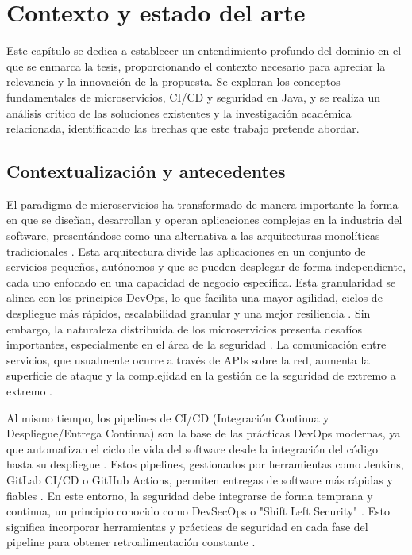\chapter{Contexto y estado del arte}\label{chap:contexto_estado_arte} %
Este capítulo se dedica a establecer un entendimiento profundo del dominio en el que se enmarca la tesis, proporcionando el contexto necesario para apreciar la relevancia y la innovación de la propuesta. Se exploran los conceptos fundamentales de microservicios, CI/CD y seguridad en Java, y se realiza un análisis crítico de las soluciones existentes y la investigación académica relacionada, identificando las brechas que este trabajo pretende abordar.

\section{Contextualización y antecedentes}\label{sec:contextyantec}
El paradigma de microservicios ha transformado de manera importante la forma en que se diseñan, desarrollan y operan aplicaciones complejas en la industria del software, presentándose como una alternativa a las arquitecturas monolíticas tradicionales \cite{Zafeiropoulos2023SecurityGaps}. Esta arquitectura divide las aplicaciones en un conjunto de servicios pequeños, autónomos y que se pueden desplegar de forma independiente, cada uno enfocado en una capacidad de negocio específica. Esta granularidad se alinea con los principios DevOps, lo que facilita una mayor agilidad, ciclos de despliegue más rápidos, escalabilidad granular y una mejor resiliencia \cite{Scheerer2020ValueMicroservices}. Sin embargo, la naturaleza distribuida de los microservicios presenta desafíos importantes, especialmente en el área de la seguridad \cite{Zafeiropoulos2023SecurityGaps, AlDhuraibi2022SecurityIssues}. La comunicación entre servicios, que usualmente ocurre a través de APIs sobre la red, aumenta la superficie de ataque y la complejidad en la gestión de la seguridad de extremo a extremo \cite{AlDhuraibi2022SecurityIssues}.

Al mismo tiempo, los pipelines de CI/CD (Integración Continua y Despliegue/Entrega Continua) son la base de las prácticas DevOps modernas, ya que automatizan el ciclo de vida del software desde la integración del código hasta su despliegue \cite{Laukkanen2017BenefitsChallengesCICD, Duvall2007ContinuousIntegration}. Estos pipelines, gestionados por herramientas como Jenkins, GitLab CI/CD o GitHub Actions, permiten entregas de software más rápidas y fiables \cite{Laukkanen2017BenefitsChallengesCICD}. En este entorno, la seguridad debe integrarse de forma temprana y continua, un principio conocido como DevSecOps o "Shift Left Security" \cite{Myrbakken2019DevSecOpsSLR}. Esto significa incorporar herramientas y prácticas de seguridad en cada fase del pipeline para obtener retroalimentación constante \cite{Myrbakken2019DevSecOpsSLR, Kumar2022DevSecOpsReview}.

